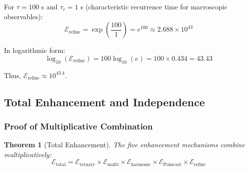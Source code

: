 \documentclass[twocolumn,10pt]{article}
\newtheorem{theorem}{Theorem}[section]
\theoremstyle{remark}
\begin{document}
For $\tau = 100$ s and $\tau_r = 1$ s (characteristic recurrence time for macroscopic observables):
\begin{equation}
    \mathcal{E}_{\text{refine}} = \exp\left(\frac{100}{1}\right) = e^{100} \approx 2.688 \times 10^{43}
    \label{eq:refinement_numerical}
\end{equation}

In logarithmic form:
\begin{equation}
    \log_{10}(\mathcal{E}_{\text{refine}}) = 100 \log_{10}(e) = 100 \times 0.434 = 43.43
    \label{eq:refinement_log}
\end{equation}

Thus, $\mathcal{E}_{\text{refine}} \approx 10^{43.4}$.

\subsection{Total Enhancement and Independence}

\subsubsection{Proof of Multiplicative Combination}

\begin{theorem}[Total Enhancement]
\label{thm:total_enhancement}
The five enhancement mechanisms combine multiplicatively:
\begin{equation}
    \mathcal{E}_{\text{total}} = \mathcal{E}_{\text{ternary}} \times \mathcal{E}_{\text{multi}} \times \mathcal{E}_{\text{harmonic}} \times \mathcal{E}_{\text{Poincaré}} \times \mathcal{E}_{\text{refine}}
    \label{eq:total_enhancement}
\end{equation}
\end{theorem}
\end{document}
